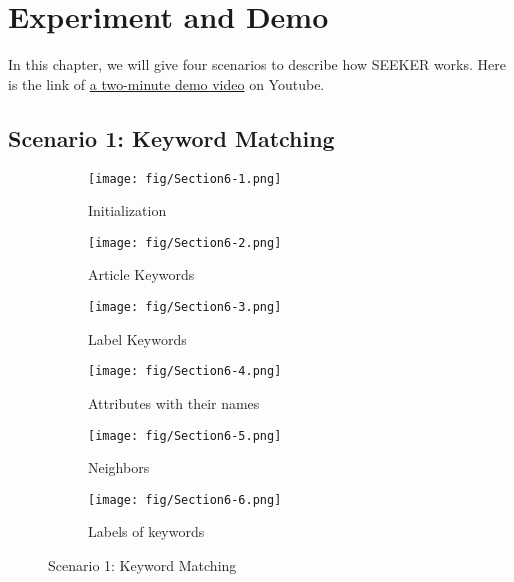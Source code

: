 \chapter{Experiment and Demo}
\label{Ch-6:Sec:Experiment}
In this chapter, we will give four scenarios to describe how SEEKER works. Here is the link of \href{https://youtu.be/oog_x8N7mC4}{a two-minute demo video} on Youtube.

\section{Scenario 1: Keyword Matching}
\begin{figure*}[!htb]
	\centering
	\begin{subfigure}{0.31\textwidth}
		\texttt{[image: fig/Section6-1.png]}
		\caption{Initialization} 
		\label{fig:section6-pic1}
	\end{subfigure}
	\hspace*{\fill} %
	\begin{subfigure}{0.31\textwidth}
		\texttt{[image: fig/Section6-2.png]}
		\caption{Article Keywords} \label{fig:section6-pic2}
	\end{subfigure}
	\hspace*{\fill} %
	\begin{subfigure}{0.31\textwidth}
		\texttt{[image: fig/Section6-3.png]}
		\caption{Label Keywords} \label{fig:section6-pic3}
	\end{subfigure}
	\vspace{10pt}
	\begin{subfigure}{0.31\textwidth}
		\texttt{[image: fig/Section6-4.png]}
		\caption{Attributes with their names} 
		\label{fig:section6-pic4}
	\end{subfigure}
	\hspace*{\fill} %
	\begin{subfigure}{0.31\textwidth}
		\texttt{[image: fig/Section6-5.png]}
		\caption{Neighbors} \label{fig:section6-pic5}
	\end{subfigure}
	\hspace*{\fill} %
	\begin{subfigure}{0.31\textwidth}
		\texttt{[image: fig/Section6-6.png]}
		\caption{Labels of keywords} \label{fig:section6-pic6}
	\end{subfigure}
	\vspace{-10pt}
	\caption{Scenario 1: Keyword Matching} \label{fig:section6-pic234}
\end{figure*}
